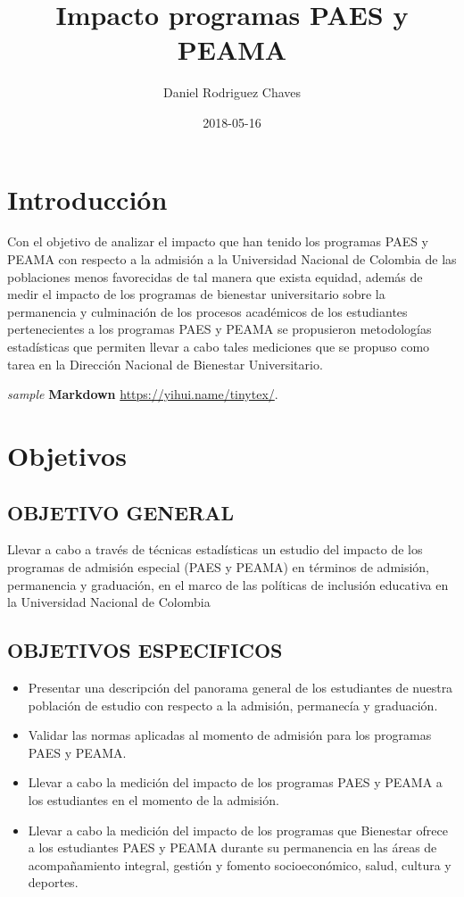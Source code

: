 \documentclass[]{book}
\title{Impacto programas PAES y PEAMA}
\author{Daniel Rodriguez Chaves}
\date{2018-05-16}
\providecommand{\tightlist}{%
  \setlength{\itemsep}{0pt}\setlength{\parskip}{0pt}}
\theoremstyle{definition}
\theoremstyle{definition}
\theoremstyle{definition}
\theoremstyle{remark}
\begin{document}
\maketitle

{
\setcounter{tocdepth}{1}
\tableofcontents
}
\chapter{Introducción}\label{introduccion}

Con el objetivo de analizar el impacto que han tenido los programas PAES
y PEAMA con respecto a la admisión a la Universidad Nacional de Colombia
de las poblaciones menos favorecidas de tal manera que exista equidad,
además de medir el impacto de los programas de bienestar universitario
sobre la permanencia y culminación de los procesos académicos de los
estudiantes pertenecientes a los programas PAES y PEAMA se propusieron
metodologías estadísticas que permiten llevar a cabo tales mediciones
que se propuso como tarea en la Dirección Nacional de Bienestar
Universitario.

\emph{sample} \textbf{Markdown} \url{https://yihui.name/tinytex/}.

\chapter{Objetivos}\label{obj}

\section{OBJETIVO GENERAL}\label{objetivo-general}

Llevar a cabo a través de técnicas estadísticas un estudio del impacto
de los programas de admisión especial (PAES y PEAMA) en términos de
admisión, permanencia y graduación, en el marco de las políticas de
inclusión educativa en la Universidad Nacional de Colombia

\section{OBJETIVOS ESPECIFICOS}\label{objetivos-especificos}

\begin{itemize}
\tightlist
\item
  Presentar una descripción del panorama general de los estudiantes de
  nuestra población de estudio con respecto a la admisión, permanecía y
  graduación.
\item
  Validar las normas aplicadas al momento de admisión para los programas
  PAES y PEAMA.
\item
  Llevar a cabo la medición del impacto de los programas PAES y PEAMA a
  los estudiantes en el momento de la admisión.
\item
  Llevar a cabo la medición del impacto de los programas que Bienestar
  ofrece a los estudiantes PAES y PEAMA durante su permanencia en las
  áreas de acompañamiento integral, gestión y fomento socioeconómico,
  salud, cultura y deportes.
\end{itemize}
\end{document}
